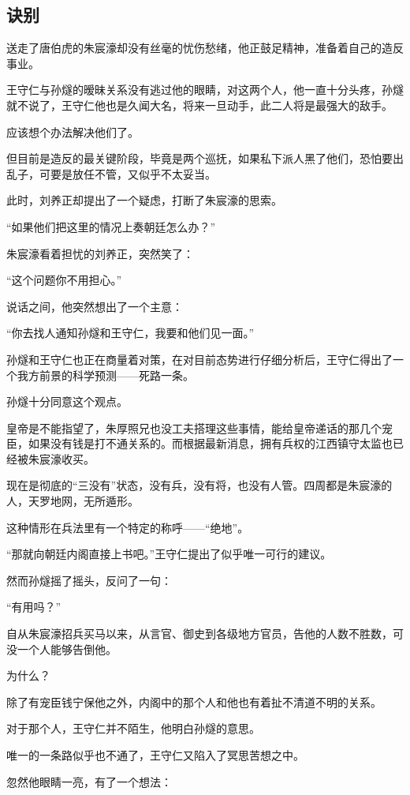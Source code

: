 \begin{multicols}{\theparacolNo}
		\subsection{诀别}
		送走了唐伯虎的朱宸濠却没有丝毫的忧伤愁绪，他正鼓足精神，准备着自己的造反事业。

		王守仁与孙燧的暧昧关系没有逃过他的眼睛，对这两个人，他一直十分头疼，孙燧就不说了，王守仁他也是久闻大名，将来一旦动手，此二人将是最强大的敌手。

		应该想个办法解决他们了。

		但目前是造反的最关键阶段，毕竟是两个巡抚，如果私下派人黑了他们，恐怕要出乱子，可要是放任不管，又似乎不太妥当。

		此时，刘养正却提出了一个疑虑，打断了朱宸濠的思索。

		“如果他们把这里的情况上奏朝廷怎么办？”

		朱宸濠看着担忧的刘养正，突然笑了：

		“这个问题你不用担心。”

		说话之间，他突然想出了一个主意：

		“你去找人通知孙燧和王守仁，我要和他们见一面。”

		孙燧和王守仁也正在商量着对策，在对目前态势进行仔细分析后，王守仁得出了一个我方前景的科学预测——死路一条。

		孙燧十分同意这个观点。

		皇帝是不能指望了，朱厚照兄也没工夫搭理这些事情，能给皇帝递话的那几个宠臣，如果没有钱是打不通关系的。而根据最新消息，拥有兵权的江西镇守太监也已经被朱宸濠收买。

		现在是彻底的“三没有”状态，没有兵，没有将，也没有人管。四周都是朱宸濠的人，天罗地网，无所遁形。

		这种情形在兵法里有一个特定的称呼——“绝地”。

		“那就向朝廷内阁直接上书吧。”王守仁提出了似乎唯一可行的建议。

		然而孙燧摇了摇头，反问了一句：

		“有用吗？”

		自从朱宸濠招兵买马以来，从言官、御史到各级地方官员，告他的人数不胜数，可没一个人能够告倒他。

		为什么？

		除了有宠臣钱宁保他之外，内阁中的那个人和他也有着扯不清道不明的关系。

		对于那个人，王守仁并不陌生，他明白孙燧的意思。

		唯一的一条路似乎也不通了，王守仁又陷入了冥思苦想之中。

		忽然他眼睛一亮，有了一个想法：


\end{multicols}
